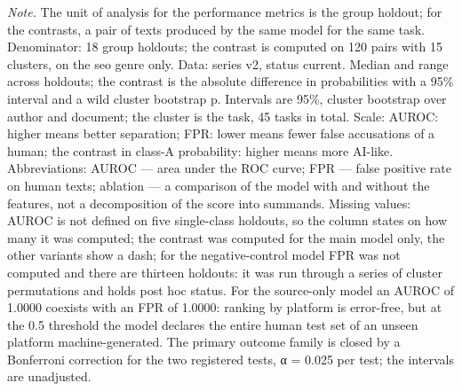 \begin{table}[htbp]
\begin{minipage}{\linewidth}
\textit{Note.} The unit of analysis for the performance metrics is the group holdout; for the contrasts, a pair of texts produced by the same model for the same task. Denominator: 18 group holdouts; the contrast is computed on 120 pairs with 15 clusters, on the seo genre only. Data: series v2, status current. Median and range across holdouts; the contrast is the absolute difference in probabilities with a 95\% interval and a wild cluster bootstrap p. Intervals are 95\%, cluster bootstrap over author and document; the cluster is the task, 45 tasks in total. Scale: AUROC: higher means better separation; FPR: lower means fewer false accusations of a human; the contrast in class-A probability: higher means more AI-like. Abbreviations: AUROC — area under the ROC curve; FPR — false positive rate on human texts; ablation — a comparison of the model with and without the features, not a decomposition of the score into summands. Missing values: AUROC is not defined on five single-class holdouts, so the column states on how many it was computed; the contrast was computed for the main model only, the other variants show a dash; for the negative-control model FPR was not computed and there are thirteen holdouts: it was run through a series of cluster permutations and holds post hoc status. For the source-only model an AUROC of 1.0000 coexists with an FPR of 1.0000: ranking by platform is error-free, but at the 0.5 threshold the model declares the entire human test set of an unseen platform machine-generated. The primary outcome family is closed by a Bonferroni correction for the two registered tests, α = 0.025 per test; the intervals are unadjusted.
\end{minipage}
\end{table}
